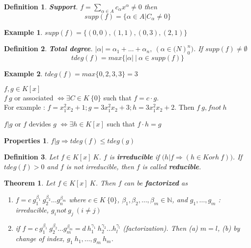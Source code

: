 \documentclass[a4paper,10pt]{article}
\newtheorem{prop}{Properties}
\newtheorem{theo}{Theorem}
\newtheorem{defi}{Definition}
\newtheorem{ex}{Example}
\begin{document}
\begin{defi}
	\textbf{Support}. $ f = \sum_{\alpha \in A} c_{\alpha} x^{\alpha} \neq 0$ then
	\[ supp(f) = \{ \alpha \in A | C_{\alpha} \neq 0 \} \]
\end{defi}

\begin{ex}
	$ supp(f) = \{ (0,0), (1,1), (0,3), (2,1) \} $
\end{ex}

\begin{defi}
	\textbf{Total degree}. $ |\alpha| = \alpha_{1} + \dots + \alpha_{n} , \ (\alpha \in \mathbb(N)_{0}^{n} )$. If $ supp(f) \neq \emptyset $
	\[ tdeg(f) = max \{ |\alpha| \ | \ \alpha \in supp(f) \} \]
\end{defi}

\begin{ex}
	$ tdeg(f) = max \{ 0,2,3,3 \} =3 $
\end{ex}


$ f,g \in K[x] $\\
$ f~g $ or associated $ \Leftrightarrow \exists C \in K \ \{0\} $ such that $ f= c \cdot g $. \\
For example : $ f = x_{1}^2 x_{2} +1 ; g = 3x_{1}^2 x_{2} +3 ; h= 3x_{1}^2 x_{2} +2 $. Then $ f~g, f not~ h $

$ f|g $ or $ f $ devides $ g $ $ \Leftrightarrow \exists h \in K[x] $ such that $ f \cdot h = g $

\begin{prop}
	$ f | g \Rightarrow tdeg(f) \leq tdeg(g) $
\end{prop}

\begin{defi}
	Let $ f \in K[x] \ K $. $ f $ is \textbf{ irreducible } if $ \Big( h|f \Rightarrow (h \in K or h~f) \Big) $. If $ tdeg(f) > 0 $ and $ f $ is not irreducible, then $ f $ is called \textbf{reducible}.
\end{defi}

\begin{theo}
	Let $ f \in K[x] \ K $. Then $ f $ can be \textbf{factorized} as
	\begin{enumerate}
		\item $ f = c \ g_{1}^{\beta_{1}} \ g_{2}^{\beta_{2}} \dots g_{n}^{\beta_{m}} $ where $ c \in K \ \{0\} $, $ \beta_{1}, \beta_{2}, \dots, \beta_{m} \in \mathbb{N}$, and $ g_{1}, \dots, g_{m} $ : irreducible, $ g_{i} not ~ g_{j} \ (i \neq j)$
		\item if $ f = c \ g_{1}^{\beta_{1}} \ g_{2}^{\beta_{2}} \dots g_{m}^{\beta_{m}} = d \ h_{1}^{\gamma_{1}} \ h_{2}^{\gamma_{2}} \dots h_{l}^{\gamma_{l}}$ (factorization). Then (a) $ m=l $, (b) by change of index, $ g_{1}~h_{1}, \dots, g_{m}~h_{m} $.
	\end{enumerate}
\end{theo}
\end{document}
